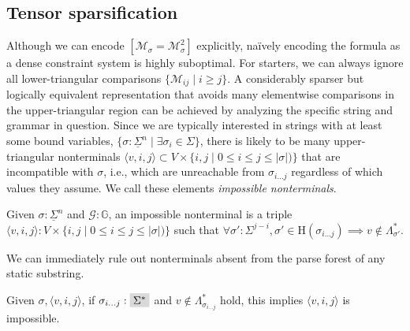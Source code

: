 \documentclass[sigplan,review,anonymous,acmsmall]{acmart}\settopmatter{printfolios=false,printccs=false,printacmref=false}
\begin{document}


%

\subsection{Tensor sparsification}\label{sec:sparsity}

Although we can encode $[\mathcal{M}_\sigma = \mathcal{M}^2_\sigma]$ explicitly, na\"ively encoding the formula as a dense constraint system is highly suboptimal. For starters, we can always ignore all lower-triangular comparisons $\{\mathcal{M}_{ij} \mid i \geq j\}$. A considerably sparser but logically equivalent representation that avoids many elementwise comparisons in the upper-triangular region can be achieved by analyzing the specific string and grammar in question. Since we are typically interested in strings with at least some bound variables, $\{\sigma: \underline\Sigma^n \mid \exists \sigma_i \in \Sigma\}$, there is likely to be many upper-triangular nonterminals $\langle v, i, j\rangle \subset V\times\{i, j \mid 0 \leq i \leq j \leq |\sigma|)\}$ that are incompatible with $\sigma$, i.e., which are unreachable from $\sigma_{i\ldots j}$ regardless of which values they assume. We call these elements \textit{impossible nonterminals}.

\begin{definition}
  Given $\sigma: \underline\Sigma^n$ and $\mathcal{G}: \mathbb{G}$, an impossible nonterminal is a triple $\langle v, i, j\rangle: V\times\{i, j \mid 0 \leq i \leq j \leq |\sigma|)\}$ such that $\forall \sigma': \Sigma^{j-i}, \sigma' \in \text{H}(\sigma_{i\ldots j}) \implies v\notin\Lambda^*_{\sigma'}$.
\end{definition}

We can immediately rule out nonterminals absent from the parse forest of any static substring.

\begin{lemma}
  Given $\sigma, \langle v, i, j \rangle$, if $\sigma_{i\ldots j}: \highlight{\Sigma^*}$ and $v \not\in \Lambda^*_{\sigma_{i \ldots j}}$ hold, this implies $\langle v, i, j \rangle$ is impossible.
\end{lemma}
\end{document}

